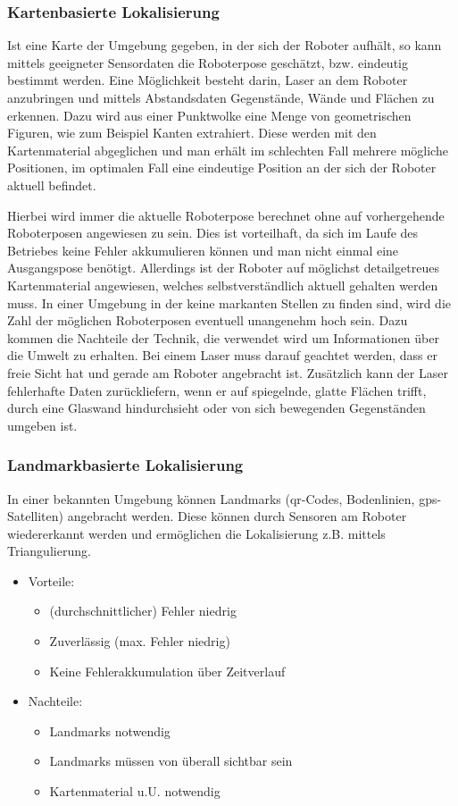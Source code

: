 \subsubsection{Kartenbasierte Lokalisierung}

Ist eine Karte der Umgebung gegeben, in der sich der Roboter aufhält, so kann mittels geeigneter Sensordaten die Roboterpose geschätzt, bzw. eindeutig bestimmt werden. Eine Möglichkeit besteht darin, Laser an dem Roboter anzubringen und mittels Abstandsdaten Gegenstände, Wände und Flächen zu erkennen. Dazu wird aus einer Punktwolke eine Menge von geometrischen Figuren, wie zum Beispiel Kanten extrahiert. Diese werden mit den Kartenmaterial abgeglichen und man erhält im schlechten Fall mehrere mögliche Positionen, im optimalen Fall eine eindeutige Position an der sich der Roboter aktuell befindet.

Hierbei wird immer die aktuelle Roboterpose berechnet ohne auf vorhergehende Roboterposen angewiesen zu sein. Dies ist vorteilhaft, da sich im Laufe des Betriebes keine Fehler akkumulieren können und man nicht einmal eine Ausgangspose benötigt. Allerdings ist der Roboter auf möglichst detailgetreues Kartenmaterial angewiesen, welches selbstverständlich aktuell gehalten werden muss. In einer Umgebung in der keine markanten Stellen zu finden sind, wird die Zahl der möglichen Roboterposen eventuell unangenehm hoch sein. Dazu kommen die Nachteile der Technik, die verwendet wird um Informationen über die Umwelt zu erhalten. Bei einem Laser muss darauf geachtet werden, dass er freie Sicht hat und gerade am Roboter angebracht ist. Zusätzlich kann der Laser fehlerhafte Daten zurückliefern, wenn er auf spiegelnde, glatte Flächen trifft, durch eine Glaswand hindurchsieht oder von sich bewegenden Gegenständen umgeben ist.  

\subsubsection{Landmarkbasierte Lokalisierung}

In einer bekannten Umgebung können Landmarks (\gls{qr}-Codes, Bodenlinien,
 \gls{gps}-Satelliten) angebracht werden. Diese können durch Sensoren
 am Roboter wiedererkannt werden und ermöglichen die Lokalisierung
 z.B. mittels Triangulierung.

\begin{itemize}
  \item Vorteile:
  \begin{itemize}
    \item (durchschnittlicher) Fehler niedrig
    \item Zuverlässig (max. Fehler niedrig)
    \item Keine Fehlerakkumulation über Zeitverlauf
  \end{itemize}
  \item Nachteile:
  \begin{itemize}
    \item Landmarks notwendig
    \item Landmarks müssen von überall sichtbar sein
    \item Kartenmaterial u.U. notwendig
   \end{itemize}
\end{itemize}

